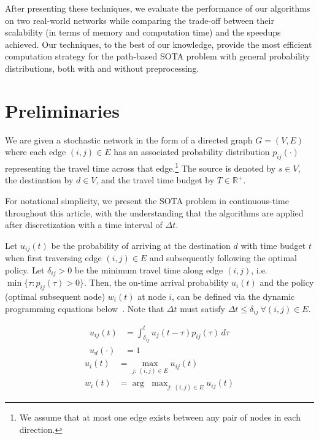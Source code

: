 \documentclass[oribibl]{llncs}
\DeclareMathOperator*{\argmax}{arg\!\!\!\ \;max}
\begin{document}
		After presenting these techniques, we evaluate the performance of our algorithms on two real-world
		networks while comparing the trade-off between their scalability
		(in terms of memory and computation time) and the speedups achieved.
		Our techniques, to the best of our knowledge, provide the most efficient computation strategy for the
		path-based SOTA problem with general probability distributions, both with and without preprocessing.

	\section{Preliminaries}
		We are given a stochastic network in the form of a directed graph $G = (V, E)$
		where each edge $(i, j) \in E$ has an associated probability distribution
		$p_{ij}(\cdot)$ representing the travel time across that edge.\footnote
		{
			We assume that at most one edge exists between any pair of nodes in each direction.
		}
		The source is denoted by $s \in V$, the destination by $d \in V$,
		and the travel time budget by $T \in \mathbb{R}^+$.

		For notational simplicity, we present the SOTA problem in continuous-time throughout this article,
		with the understanding that the algorithms are applied after discretization with a
		time interval of $\Delta t$.

		\begin{definition}
			Let $u_{ij}(t)$ be the probability of arriving at the destination $d$
			with time budget $t$ when first traversing edge $(i, j) \in E$
			and subsequently following the optimal policy.
			Let $\delta_{ij} > 0$ be the minimum travel time along edge $(i, j)$, i.e. $\min \{\tau : p_{ij}(\tau) > 0\}$.
			Then, the on-time arrival probability $u_i(t)$ and the policy (optimal subsequent node) $w_i(t)$ at node $i$,
			can be defined via the dynamic programming equations below~\cite{fan2005arriving}.
			Note that $\Delta t$ must satisfy $\Delta t \leq \delta_{ij}\ \forall {(i, j) \in E}$.
			\begin{multicols}{2}
				\noindent
				\begin{align*}
					u_{ij}(t) &= \int_{\delta_{ij}}^t u_j(t - \tau) p_{ij}(\tau)\,d\tau  \\
					u_{d}(\cdot) &= 1
				\end{align*}
				\begin{align*}
					u_{i}(t) &=    \max_{j:\,(i, j) \in E} u_{ij}(t)  \\
					w_{i}(t) &= \argmax_{j:\,(i, j) \in E} u_{ij}(t)
				\end{align*}
			\end{multicols}
		\end{definition}
\end{document}
